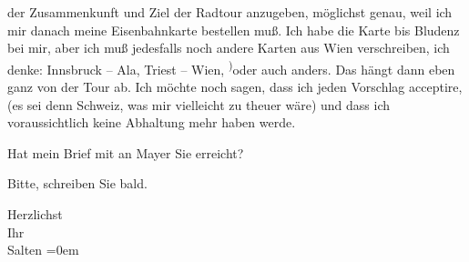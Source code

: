                der Zusammenkunft und Ziel der Radtour anzugeben, möglichst genau, weil ich mir
               danach meine Eisenbahnkarte bestellen muß. Ich habe die Karte bis Bludenz bei mir, aber ich muß jedesfalls noch andere Karten
               aus Wien verschreiben, ich denke: \strikeout{(}Innsbruck – Ala, Triest – Wien, \substVorne{}\textsuperscript{)}\substDazwischen{}o\substHinten{}der auch anders. Das hängt dann eben ganz von der Tour ab. {\pb}Ich möchte noch sagen, dass ich
               jeden Vorschlag acceptire, (es sei denn Schweiz, was mir vielleicht zu theuer wäre) und dass ich voraussichtlich keine
               Abhaltung mehr haben werde.\pend
           
\pstart
           Hat mein Brief mit
               \label{K_L03310-2v}\label{K_L03310-2} an Mayer Sie erreicht?\pend
           
\pstart
           Bitte, schreiben Sie bald.\pend
           
\pstart
           Herzlichst {\\[\baselineskip]}Ihr {\\[\baselineskip]}\spacefill\mbox{Salten}\pend
           \leftskip=0em{}\endnumbering{}  \newcommand{\dateiname}{L03310}\newcommand{\titel}{Felix Salten an Arthur Schnitzler, 14. 8. 1900}\newcommand{\editorInnen}{Martin Anton Müller und Laura Untner}
